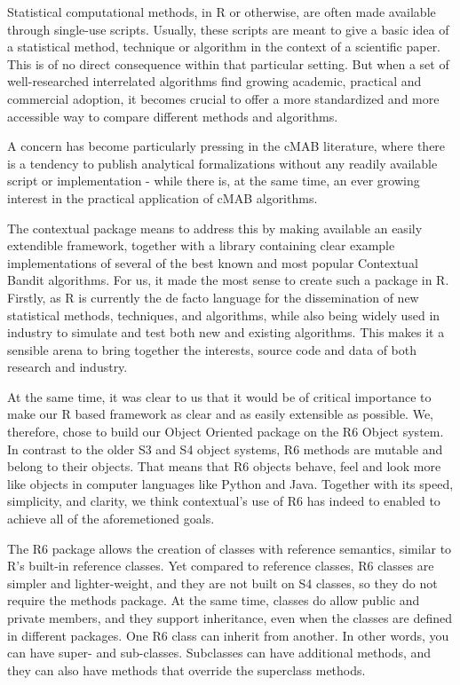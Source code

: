 \documentclass[nojss]{jss}\usepackage[]{graphicx}\usepackage[]{color}
\begin{document}
Statistical computational methods, in R or otherwise,  are often made available through single-use scripts. Usually, these scripts are meant to give a basic idea of a statistical method, technique or algorithm in the context of a scientific paper. This is of no direct consequence within that particular setting. But when a set of well-researched interrelated algorithms find growing academic, practical and commercial adoption, it becomes crucial to offer a more standardized and more accessible way to compare different methods and algorithms.

A concern has become particularly pressing in the cMAB literature, where there is a tendency to publish analytical formalizations without any readily available script or implementation - while there is, at the same time, an ever growing interest in the practical application of cMAB algorithms.

The contextual package means to address this by making available an easily extendible framework, together with a library containing clear example implementations of several of the best known and most popular Contextual Bandit algorithms. For us, it made the most sense to create such a package in R. Firstly, as R is currently the de facto language for the dissemination of new statistical methods, techniques, and algorithms, while also being widely used in industry to simulate and test both new and existing algorithms. This makes it a sensible arena to bring together the interests, source code and data of both research and industry.

At the same time, it was clear to us that it would be of critical importance to make our R based framework as clear and as easily extensible as possible. We, therefore, chose to build our Object Oriented package on the R6 Object system. In contrast to the older S3 and S4 object systems, R6 methods are mutable and belong to their objects. That means that R6 objects behave, feel and look more like objects in computer languages like Python and Java. Together with its speed, simplicity, and clarity, we think contextual's use of R6 has indeed to enabled to achieve all of the aforemetioned goals.

The R6 package allows the creation of classes with reference semantics, similar to R's built-in reference classes. Yet compared to reference classes, R6 classes are simpler and lighter-weight, and they are not built on S4 classes, so they do not require the methods package. At the same time, classes do allow public and private members, and they support inheritance, even when the classes are defined in different packages. One R6 class can inherit from another. In other words, you can have super- and sub-classes. Subclasses can have additional methods, and they can also have methods that override the superclass methods.
\end{document}
